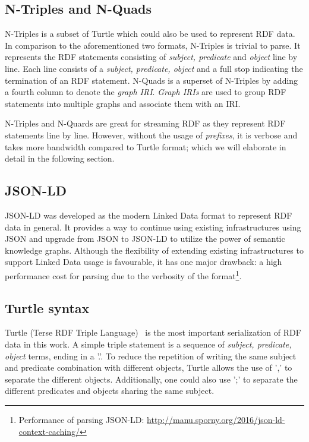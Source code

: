 \subsection{N-Triples and N-Quads}
N-Triples\cite{N-Triples} is a subset of Turtle which could also be used 
to represent RDF data. In comparison to the aforementioned two formats, N-Triples is trivial to parse. 
It represents the RDF statements consisting of \emph{subject, predicate} and \emph{object} line by line. 
Each line consists of a \emph{subject, predicate, object} and a full stop indicating the termination of 
an RDF statement. N-Quads is a superset of N-Triples by adding a fourth column to denote the \emph{graph IRI}.
\emph{Graph IRIs} are used to group RDF statements into multiple graphs and associate them with an IRI.  

N-Triples and N-Quards are great for streaming RDF as they 
represent RDF statements line by line. However, without the usage of \emph{prefixes}, it is verbose and takes more 
bandwidth compared to Turtle format; which we will elaborate in detail in the following section.


\subsection{JSON-LD}
JSON-LD\cite{JSON-LD} was developed as 
the modern Linked Data format to represent RDF data in general. 
It provides a way to continue using existing 
infrastructures using JSON and upgrade from JSON to JSON-LD to utilize the power of semantic knowledge graphs. 
Although the flexibility of extending existing infrastructures to support Linked Data usage 
is favourable, it has one major drawback: a high performance cost for parsing due to 
the verbosity of the format\footnote{Performance of parsing JSON-LD: \url{http://manu.sporny.org/2016/json-ld-context-caching/}}.


\subsection{Turtle syntax}
\label{sec:turtle_syntax}
Turtle (Terse RDF Triple Language)~\cite{turtle_syntax}
is the most important serialization of RDF data in this work.
 A simple triple statement is a sequence of
\textit{subject, predicate, object} terms, ending in a '.'.
To reduce the repetition of writing the same subject and predicate combination with
different objects, Turtle allows the use of ',' to separate the different objects.
Additionally, one could also use ';' to separate the different predicates and objects sharing the
same subject. 


